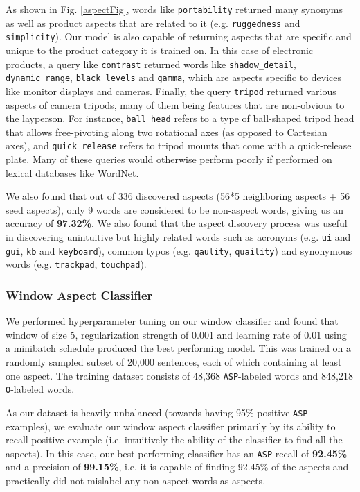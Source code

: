 \documentclass{article} %
\begin{document}
As shown in Fig. \ref{aspectFig}, words like \texttt{portability} returned many synonyms as well as product aspects that are related to it (e.g. \texttt{ruggedness} and \texttt{simplicity}). Our model is also capable of returning aspects that are specific and unique to the product category it is trained on. In this case of electronic products, a query like \texttt{contrast} returned words like \texttt{shadow\_detail}, \texttt{dynamic\_range}, \texttt{black\_levels} and \texttt{gamma}, which are aspects specific to devices like monitor displays and cameras. Finally, the query \texttt{tripod} returned various aspects of camera tripods, many of them being features that are non-obvious to the layperson. For instance, \texttt{ball\_head} refers to a type of ball-shaped tripod head that allows free-pivoting along two rotational axes (as opposed to Cartesian axes), and \texttt{quick\_release} refers to tripod mounts that come with a quick-release plate. Many of these queries would otherwise perform poorly if performed on lexical databases like WordNet.

We also found that out of 336 discovered aspects (56*5 neighboring aspects + 56 seed aspects), only 9 words are considered to be non-aspect words, giving us an accuracy of \textbf{97.32\%}. We also found that the aspect discovery process was useful in discovering unintuitive but highly related words such as acronyms (e.g. \texttt{ui} and \texttt{gui}, \texttt{kb} and \texttt{keyboard}), common typos (e.g. \texttt{qaulity}, \texttt{quaility}) and synonymous words (e.g. \texttt{trackpad}, \texttt{touchpad}).

\subsubsection{Window Aspect Classifier}
We performed hyperparameter tuning on our window classifier and found that window of size 5, regularization strength of 0.001 and learning rate of 0.01 using a minibatch schedule produced the best performing model. This was trained on a randomly sampled subset of 20,000 sentences, each of which containing at least one aspect. The training dataset consists of 48,368 \texttt{ASP}-labeled words and 848,218 \texttt{O}-labeled words. 

As our dataset is heavily unbalanced (towards having 95\% positive \texttt{ASP} examples), we evaluate our window aspect classifier primarily by its ability to recall positive example (i.e. intuitively the ability of the classifier to find all the aspects). In this case, our best performing classifier has an \texttt{ASP} recall of \textbf{92.45\%} and a precision of \textbf{99.15\%}, i.e. it is capable of finding 92.45\% of the aspects and practically did not mislabel any non-aspect words as aspects.
\end{document}
